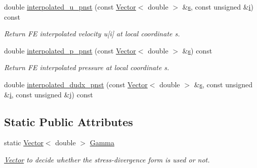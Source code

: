 \begin{DoxyCompactItemize}
double \hyperlink{classoomph_1_1PolarNavierStokesEquations_a0913099164d0d4762b67aa0c0f46a39e}{interpolated\+\_\+u\+\_\+pnst} (const \hyperlink{classoomph_1_1Vector}{Vector}$<$ double $>$ \&\hyperlink{cfortran_8h_ab7123126e4885ef647dd9c6e3807a21c}{s}, const unsigned \&\hyperlink{cfortran_8h_adb50e893b86b3e55e751a42eab3cba82}{i}) const
\begin{DoxyCompactList}\small\item\em Return FE interpolated velocity u\mbox{[}i\mbox{]} at local coordinate s. \end{DoxyCompactList}\item 
double \hyperlink{classoomph_1_1PolarNavierStokesEquations_afcc85389a45dfa0e811852012fc40442}{interpolated\+\_\+p\+\_\+pnst} (const \hyperlink{classoomph_1_1Vector}{Vector}$<$ double $>$ \&\hyperlink{cfortran_8h_ab7123126e4885ef647dd9c6e3807a21c}{s}) const
\begin{DoxyCompactList}\small\item\em Return FE interpolated pressure at local coordinate s. \end{DoxyCompactList}\item 
double \hyperlink{classoomph_1_1PolarNavierStokesEquations_af92453e32bfbc37cd9dd93992d1e4211}{interpolated\+\_\+dudx\+\_\+pnst} (const \hyperlink{classoomph_1_1Vector}{Vector}$<$ double $>$ \&\hyperlink{cfortran_8h_ab7123126e4885ef647dd9c6e3807a21c}{s}, const unsigned \&\hyperlink{cfortran_8h_adb50e893b86b3e55e751a42eab3cba82}{i}, const unsigned \&j) const
\end{DoxyCompactItemize}
\subsection*{Static Public Attributes}
\begin{DoxyCompactItemize}
\item 
static \hyperlink{classoomph_1_1Vector}{Vector}$<$ double $>$ \hyperlink{classoomph_1_1PolarNavierStokesEquations_a3370b89e66379cb0b53417db39357e77}{Gamma}
\begin{DoxyCompactList}\small\item\em \hyperlink{classoomph_1_1Vector}{Vector} to decide whether the stress-\/divergence form is used or not. \end{DoxyCompactList}\end{DoxyCompactItemize}
